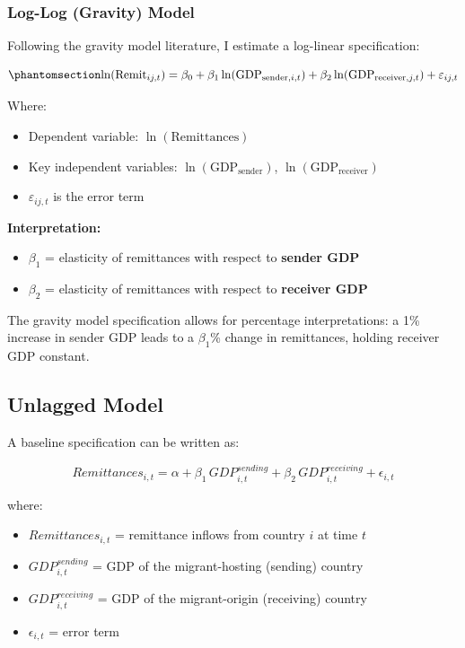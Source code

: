 \documentclass[
  11pt,
]{article}
\providecommand{\tightlist}{%
  \setlength{\itemsep}{0pt}\setlength{\parskip}{0pt}}\usepackage{longtable,booktabs,array}
\begin{document}
\subsubsection{Log-Log (Gravity) Model}\label{log-log-gravity-model}

Following the gravity model literature, I estimate a log-linear
specification:

\begin{equation}\phantomsection\label{eq-gravity}{
\ln(\text{Remit}_{ij,t}) = \beta_0 + \beta_1 \ln(\text{GDP}_{\text{sender},i,t}) + \beta_2 \ln(\text{GDP}_{\text{receiver},j,t}) + \varepsilon_{ij,t}
}\end{equation}

Where:

\begin{itemize}
\tightlist
\item
  Dependent variable: \(\ln(\text{Remittances})\)
\item
  Key independent variables: \(\ln(\text{GDP}_{\text{sender}})\),
  \(\ln(\text{GDP}_{\text{receiver}})\)
\item
  \(\varepsilon_{ij,t}\) is the error term
\end{itemize}

\textbf{Interpretation:}

\begin{itemize}
\tightlist
\item
  \(\beta_1\) = elasticity of remittances with respect to \textbf{sender
  GDP}
\item
  \(\beta_2\) = elasticity of remittances with respect to
  \textbf{receiver GDP}
\end{itemize}

The gravity model specification allows for percentage interpretations: a
1\% increase in sender GDP leads to a \(\beta_1\)\% change in
remittances, holding receiver GDP constant.

\subsection{Unlagged Model}\label{unlagged-model}

A baseline specification can be written as:

\[
Remittances_{i,t} = \alpha 
+ \beta_1 \, GDP^{sending}_{i,t} 
+ \beta_2 \, GDP^{receiving}_{i,t} 
+ \epsilon_{i,t}
\]

where:

\begin{itemize}
\tightlist
\item
  \(Remittances_{i,t}\) = remittance inflows from country \(i\) at time
  \(t\)\\
\item
  \(GDP^{sending}_{i,t}\) = GDP of the migrant-hosting (sending)
  country\\
\item
  \(GDP^{receiving}_{i,t}\) = GDP of the migrant-origin (receiving)
  country\\
\item
  \(\epsilon_{i,t}\) = error term
\end{itemize}
\end{document}
